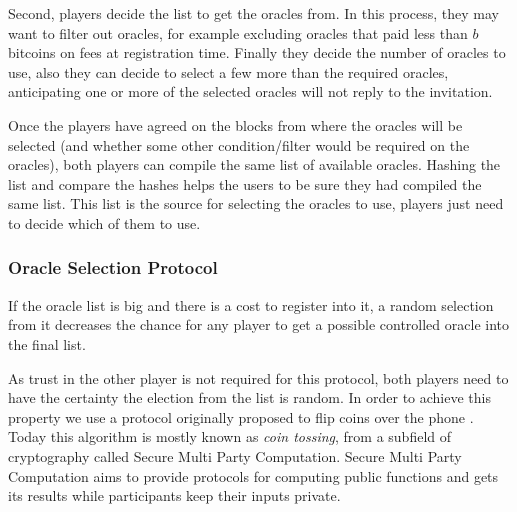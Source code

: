 Second, players decide the list to get the oracles from.
In this process, they may want to filter out oracles, for example excluding
  oracles that paid less than $b$ bitcoins on fees at registration time.
Finally they decide the number of oracles to use, also they can decide to
  select a few more than the required oracles, anticipating one or more of
  the selected oracles will not reply to the invitation.

Once the players have agreed on the blocks from where the oracles will be
  selected (and whether some other condition/filter would be required on the
  oracles), both players can compile the same list of available oracles.
Hashing the list and compare the hashes helps the users to be sure they had
  compiled the same list.
This list is the source for selecting the oracles to use, players just need to
  decide which of them to use.

\subsubsection{Oracle Selection Protocol}

If the oracle list is big and there is a cost to register into it, a random
  selection from it decreases the chance for any player to get a possible
  controlled oracle into the final list.

As trust in the other player is not required for this protocol, both players
need to have the certainty the election from the list is random.
In order to achieve this property we use a protocol originally proposed to flip
  coins over the phone \cite{blum1983coin}.
Today this algorithm is mostly known as \textit{coin tossing}, from a subfield of
  cryptography called Secure Multi Party Computation.
Secure Multi Party Computation aims to provide protocols for computing public
  functions and gets its results while participants keep their inputs private.

